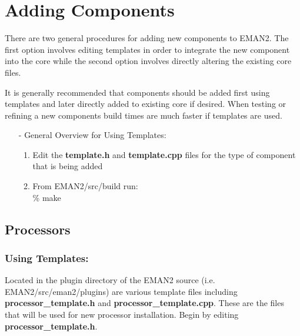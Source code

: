 \section{Adding Components}
  \label{ADDING-COMPONENTS}

There are two general procedures for adding new components to EMAN2.
The first option involves editing templates in order to integrate the
new component into the core while the second option involves directly
altering the existing core files.  

It is generally recommended that components should be added first
using templates and later directly added to existing core if 
desired.  When testing or refining a new components build times are much
faster if templates are used.  
\begin{itemize}
  \item[-]
    General Overview for Using Templates:
    \begin{enumerate}
    \item
      Edit the \textbf{\color[named]{Brown}template.h} and
      \textbf{\color[named]{Brown}template.cpp} files for the type of 
      component that is being added
    \item
      From EMAN2/src/build run:\\
      {\color[named]{Blue} \% make}
    \end{enumerate}
\end{itemize}

\subsection{Processors}
  \label{ADDING-PROCESSORS} 

      \subsubsection{Using Templates:}
      Located in the plugin directory of the EMAN2 source
      (i.e. EMAN2/src/eman2/plugins) are various template files including
      \textbf{\color[named]{Brown}processor\_template.h} and \textbf{\color[named]{Brown}processor\_template.cpp}.  These are the files
      that will be used for new processor installation.  Begin by editing
      \textbf{\color[named]{Brown}processor\_template.h}. 

